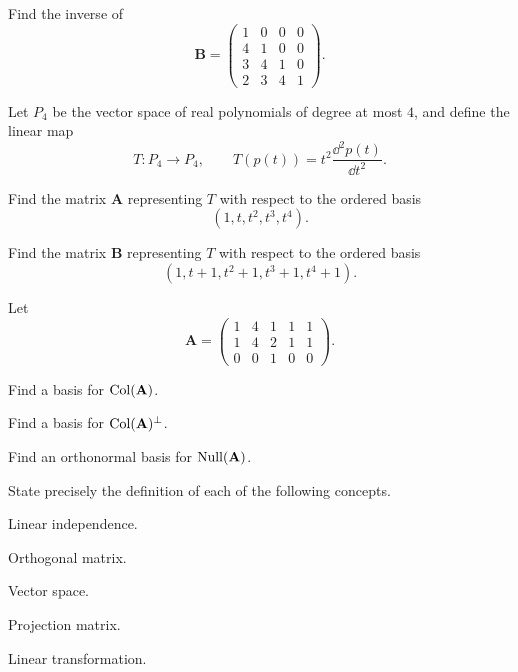 \begin{problem}
Find the inverse of
\[
\mathbf B=
\begin{pmatrix}
1&0&0&0\\
4&1&0&0\\
3&4&1&0\\
2&3&4&1
\end{pmatrix}.
\]
\end{problem}

\begin{problem}
Let $P_4$ be the vector space of real polynomials of degree at most $4$, and define the linear map
\[
T\colon P_4\to P_4,
\qquad
T(p(t))=t^2\frac{\dd^2p(t)}{\dd t^2}.
\]
\begin{problemsubparts}
\item Find the matrix $\mathbf A$ representing $T$ with respect to the ordered basis
\[
(1,t,t^2,t^3,t^4).
\]
\item Find the matrix $\mathbf B$ representing $T$ with respect to the ordered basis
\[
(1,t+1,t^2+1,t^3+1,t^4+1).
\]
\end{problemsubparts}
\end{problem}

\begin{problem}
Let
\[
\mathbf A=
\begin{pmatrix}
1&4&1&1&1\\
1&4&2&1&1\\
0&0&1&0&0
\end{pmatrix}.
\]
\begin{problemsubparts}
\item Find a basis for $\operatorname{Col}(\mathbf A)$.
\item Find a basis for $\operatorname{Col}(\mathbf A)^\perp$.
\item Find an orthonormal basis for $\operatorname{Null}(\mathbf A)$.
\end{problemsubparts}
\end{problem}

\begin{problem}
State precisely the definition of each of the following concepts.
\begin{problemchoices}
\item Linear independence.
\item Orthogonal matrix.
\item Vector space.
\item Projection matrix.
\item Linear transformation.
\end{problemchoices}
\end{problem}

